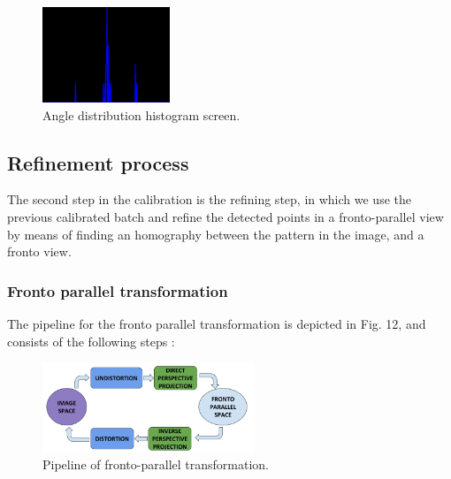 \documentclass[journal]{IEEEtran}
\begin{document}
\begin{figure}[H]
\centering
\includegraphics[width=1.5in]{_img/img_report3_angle_histogram.png}
\caption{Angle distribution histogram screen.}
\end{figure}

\subsection{ \textbf{ Refinement process } }

The second step in the calibration is the refining step, in which we use the previous calibrated batch and refine the detected points in a fronto-parallel view by means of finding an homography between the pattern in the image, and a fronto view.

\subsubsection{ \textbf{ Fronto parallel transformation } }

The pipeline for the fronto parallel transformation is depicted in Fig. 12, and consists of the following steps :

\begin{figure}[H]
\centering
\includegraphics[width=2.5in]{_img/report_4/img_fronto_parallel_pipeline.png}
\caption{Pipeline of fronto-parallel transformation.}
\end{figure}
\end{document}
